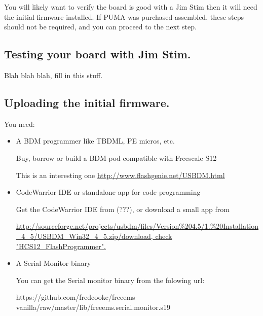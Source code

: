 \documentclass[12pt,a4paper,titlepage]{article}
\begin{document}
You will likely want to verify the board is good with a Jim Stim  then it will need the initial firmware installed. If PUMA was purchased assembled, these steps should not be required, and you can proceed to the next step.

\subsection{Testing your board with Jim Stim.}

Blah blah blah, fill in this stuff.

\subsection{Uploading the initial firmware.}

You need:
\begin{itemize}
\item A BDM programmer like TBDML, PE micros, etc.

Buy, borrow or build a BDM pod compatible with Freescale S12

This is an interesting one \url{http://www.flashgenie.net/USBDM.html}

\item CodeWarrior IDE or standalone app for code programming

Get the CodeWarrior IDE from (???), or download a small app from

\url{http://sourceforge.net/projects/usbdm/files/Version%204.5/1.%20Installation_4_5/USBDM_Win32_4_5.zip/download, check "HCS12_FlashProgrammer".}

\item A Serial Monitor binary

You can get the Serial monitor binary from the folowing url:
\newline

https://github.com/fredcooke/freeems-vanilla/raw/master/lib/freeems.serial.monitor.s19
\newline


\end{itemize}
\end{document}

